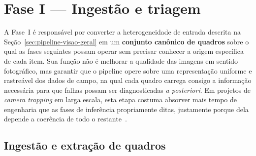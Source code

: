\section{Fase I --- Ingestão e triagem}
\label{sec:pipeline-fase1}

A Fase~I é responsável por converter a heterogeneidade de entrada descrita na Seção~\ref{sec:pipeline-visao-geral} em um \textbf{conjunto canônico de quadros} sobre o qual as fases seguintes possam operar sem precisar conhecer a origem específica de cada item. Sua função não é melhorar a qualidade das imagens em sentido fotográfico, mas garantir que o pipeline opere sobre uma representação uniforme e rastreável dos dados de campo, na qual cada quadro carrega consigo a informação necessária para que falhas possam ser diagnosticadas \emph{a posteriori}. Em projetos de \emph{camera trapping} em larga escala, esta etapa costuma absorver mais tempo de engenharia que as fases de inferência propriamente ditas, justamente porque dela depende a coerência de todo o restante~\cite{velez2022choosing,bruce2025largescale}.

\subsection*{Ingestão e extração de quadros}

